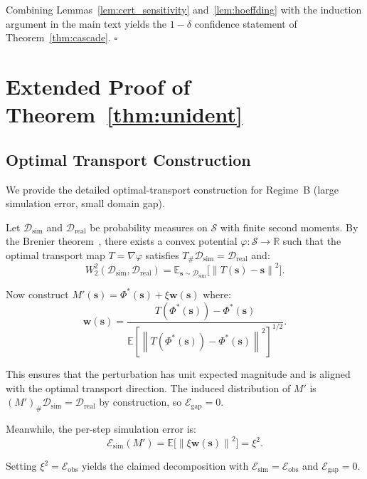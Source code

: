 \documentclass[11pt,twocolumn]{article}
\theoremstyle{definition}
\newcommand{\R}{\mathbb{R}}
\newcommand{\E}{\mathbb{E}}
\newcommand{\cS}{\mathcal{S}}
\newcommand{\cD}{\mathcal{D}}
\newcommand{\norm}[1]{\left\lVert#1\right\rVert}
\begin{document}
Combining Lemmas~\ref{lem:cert_sensitivity} and~\ref{lem:hoeffding} with the
induction argument in the main text yields the $1-\delta$ confidence statement
of Theorem~\ref{thm:cascade}.  $\square$

\section{Extended Proof of Theorem~\ref{thm:unident}}

\subsection{Optimal Transport Construction}

We provide the detailed optimal-transport construction for Regime~B (large
simulation error, small domain gap).

Let $\cD_{\text{sim}}$ and $\cD_{\text{real}}$ be probability measures on
$\cS$ with finite second moments.  By the Brenier theorem~\cite{brenier1991},
there exists a convex potential $\varphi: \cS \to \R$ such that the optimal
transport map $T = \nabla\varphi$ satisfies $T_\# \cD_{\text{sim}} =
\cD_{\text{real}}$ and:
\begin{equation}
  W_2^2(\cD_{\text{sim}}, \cD_{\text{real}}) =
  \E_{\mathbf{s} \sim \cD_{\text{sim}}}\bigl[ \norm{T(\mathbf{s}) - \mathbf{s}}^2 \bigr].
\end{equation}

Now construct $M'(\mathbf{s}) = \Phi^*(\mathbf{s}) + \xi\mathbf{w}(\mathbf{s})$
where:
\begin{equation}
  \mathbf{w}(\mathbf{s}) =
  \frac{T(\Phi^*(\mathbf{s})) - \Phi^*(\mathbf{s})}{
    \E[\norm{T(\Phi^*(\mathbf{s})) - \Phi^*(\mathbf{s})}^2]^{1/2}}.
\end{equation}

This ensures that the perturbation has unit expected magnitude and is aligned
with the optimal transport direction.  The induced distribution of $M'$ is
$(M')_\# \cD_{\text{sim}} = \cD_{\text{real}}$ by construction, so
$\mathcal{E}_{\text{gap}} = 0$.

Meanwhile, the per-step simulation error is:
\begin{equation}
  \mathcal{E}_{\text{sim}}(M') =
  \E\bigl[ \norm{\xi \mathbf{w}(\mathbf{s})}^2 \bigr] = \xi^2.
\end{equation}

Setting $\xi^2 = \mathcal{E}_{\text{obs}}$ yields the claimed decomposition
with $\mathcal{E}_{\text{sim}} = \mathcal{E}_{\text{obs}}$ and
$\mathcal{E}_{\text{gap}} = 0$.
\end{document}
